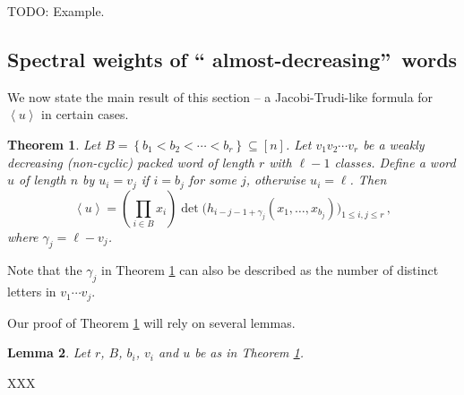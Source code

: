 \documentclass[reqno]{amsart}%
\newcommand{\0}{\phantom{c}}
\let\prodnonlimits\prod
\renewcommand{\prod}{\prodnonlimits\limits}
\theoremstyle{plain}
\newtheorem{thm}{Theorem}[section]
\newtheorem{lemma}[thm]{Lemma}
\theoremstyle{definition}
\numberwithin{equation}{section}
\begin{document}
TODO: Example.

\subsection{Spectral weights of \textquotedblleft
almost-decreasing\textquotedblright\ words}

We now state the main result of this section -- a Jacobi-Trudi-like formula
for $\left\langle u\right\rangle $ in certain cases.

\begin{thm}
\label{thm:determinant_form} Let $B=\left\{  b_{1}<b_{2}<\cdots<b_{r}\right\}
\subseteq\left[  n\right]  $. Let $v_{1}v_{2}\dotsm v_{r}$ be a weakly
decreasing (non-cyclic) packed word of length $r$ with $\ell-1$ classes.
Define a word $u$ of length $n$ by $u_{i}=v_{j}$ if $i=b_{j}$ for some $j$,
otherwise $u_{i}=\ell$. Then
\[
\left\langle u\right\rangle =\left(  \prod_{i\in B}x_{i}\right)
\det\bigl(h_{i-j-1+\gamma_{j}}(x_{1},\dotsc,x_{b_{j}})\bigr)_{1\leq i,j\leq
r}\,,
\]
where $\gamma_{j}=\ell-v_{j}$.
\end{thm}

Note that the $\gamma_{j}$ in Theorem \ref{thm:determinant_form} can also be
described as the number of distinct letters in $v_{1}\dotsm v_{j}$.

Our proof of Theorem \ref{thm:determinant_form} will rely on several lemmas.

\begin{lemma}
\label{lem:determinant_form.1}Let $r$, $B$, $b_{i}$, $v_{i}$ and $u$ be as in
Theorem \ref{thm:determinant_form}. 
\end{lemma}

XXX



{}
\end{document}
